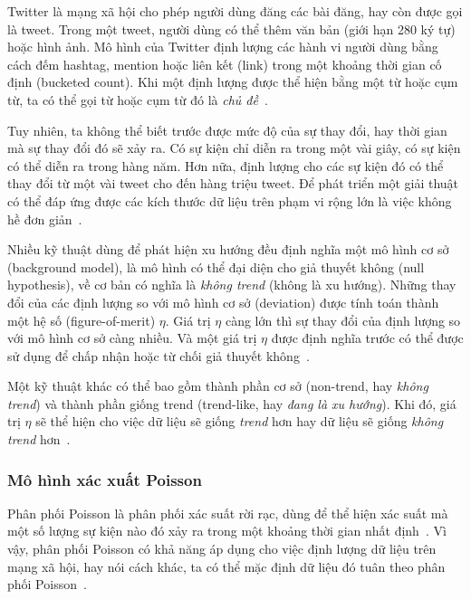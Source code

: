 Twitter là mạng xã hội cho phép người dùng đăng các bài đăng, hay còn được gọi
là tweet. Trong một tweet, người dùng có thể thêm văn bản (giới hạn 280 ký tự)
hoặc hình ảnh. Mô hình của Twitter định lượng các hành vi người dùng bằng cách
đếm hashtag, mention hoặc liên kết (link) trong một khoảng thời gian cố định
(bucketed count). Khi một định lượng được thể hiện bằng một từ hoặc cụm từ, ta
có thể gọi từ hoặc cụm từ đó là \textit{chủ
đề}~\cite{hendricksonTrendDetectionSocial2015}.

Tuy nhiên, ta không thể biết trước được mức độ của sự thay đổi, hay thời gian
mà sự thay đổi đó sẽ xảy ra. Có sự kiện chỉ diễn ra trong một vài giây, có sự
kiện có thể diễn ra trong hàng năm. Hơn nữa, định lượng cho các sự kiện đó có
thể thay đổi từ một vài tweet cho đến hàng triệu tweet. Để phát triển một giải
thuật có thể đáp ứng được các kích thước dữ liệu trên phạm vi rộng lớn là việc
không hề đơn giản~\cite{hendricksonTrendDetectionSocial2015}.

Nhiều kỹ thuật dùng để phát hiện xu hướng đều định nghĩa một mô hình cơ sở
(background model), là mô hình có thể đại diện cho giả thuyết không (null
hypothesis), về cơ bản có nghĩa là \textit{không trend} (không là xu hướng).
Những thay đổi của các định lượng so với mô hình cơ sở (deviation) được tính
toán thành một hệ số (figure-of-merit) $\eta$. Giá trị $\eta$ càng lớn thì sự
thay đổi của định lượng so với mô hình cơ sở càng nhiều. Và một giá trị $\eta$
được định nghĩa trước có thể được sử dụng để chấp nhận hoặc từ chối giả thuyết
không~\cite{hendricksonTrendDetectionSocial2015}.

Một kỹ thuật khác có thể bao gồm thành phần cơ sở (non-trend, hay \textit{không
trend}) và thành phần giống trend (trend-like, hay \textit{đang là xu hướng}).
Khi đó, giá trị $\eta$ sẽ thể hiện cho việc dữ liệu sẽ giống \textit{trend} hơn
hay dữ liệu sẽ giống \textit{không trend}
hơn~\cite{hendricksonTrendDetectionSocial2015}.

\subsubsection{Mô hình xác xuất Poisson}

Phân phối Poisson là phân phối xác suất rời rạc, dùng để thể hiện xác suất mà
một số lượng sự kiện nào đó xảy ra trong một khoảng thời gian nhất
định~\cite{haightHandbookPoissonDistribution1967}. Vì vậy, phân phối Poisson có
khả năng áp dụng cho việc định lượng dữ liệu trên mạng xã hội, hay nói cách
khác, ta có thể mặc định dữ liệu đó tuân theo phân phối
Poisson~\cite{hendricksonTrendDetectionSocial2015}.

